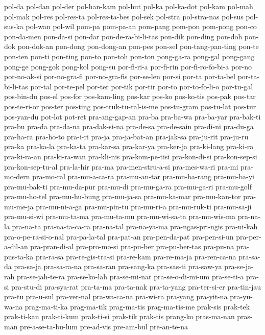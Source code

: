 {pol-da pol-dan pol-der pol-han-kam pol-hut pol-ka pol-ka-dot pol-kam
pol-mah pol-mak pol-res pol-res-ta pol-res-ta-bes pol-sek pol-stra
pol-stra-nas pol-sus pol-sus-ka pol-wan pol-wil pom-pa pom-pa-an pom-pang
pom-pon pom-pong pon-co pon-da-men pon-da-si pon-dar pon-de-ra-bi-li-tas
pon-dik pon-ding pon-doh pon-dok pon-dok-an pon-dong pon-dong-an pon-pes
pon-sel pon-tang-pan-ting pon-te pon-ten pon-ti pon-ting pon-to pon-toh
pon-ton pong-ga-ra pong-gal pong-gang pong-ge pong-gok pong-kol pong-su
por-fi-ri-a por-fi-rin por-fi-ro-fo-bi-a por-no por-no-ak-si por-no-gra-fi
por-no-gra-fis por-se-len por-si por-ta por-ta-bel por-ta-bi-li-tas
por-tal por-te-pel por-ter por-tik por-tir por-to por-to-fo-li-o
por-tu-gal pos-bin-du pos-el pos-for pos-kam-ling pos-kar pos-ko
pos-ko-tis pos-pak pos-tar pos-te-ri-or pos-ter pos-ting
pos-truk-tu-ral-is-me pos-tu-gram pos-tu-lat pos-tur pos-yan-du pot-lot
pot-ret pra-ang-gap-an pra-ba pra-ba-wa pra-ba-yar pra-bak-ti pra-bu
pra-da pra-da-na pra-dak-si-na pra-de-sa pra-de-sain pra-di-ni pra-du-ga
pra-ha-ra pra-ho-to pra-i-ri pra-ja pra-ja-bat-an pra-jak-sa pra-ju-rit
pra-ju-ru pra-ka pra-ka-la pra-ka-ta pra-kar-sa pra-kar-ya pra-ker-ja
pra-ki-lang pra-ki-ra pra-ki-ra-an pra-ki-ra-wan pra-kli-nis
pra-kom-pe-tisi pra-kon-di-si pra-kon-sep-si pra-kon-sep-tu-al pra-la-hir
pra-ma pra-men-stru-a-si pra-mes-wa-ri pra-mi pra-mo-dern pra-mo-ral
pra-mu-a-ca-ra pra-mu-an-tar pra-mu-ba-rang pra-mu-ba-yi pra-mu-bak-ti
pra-mu-da-pur pra-mu-di pra-mu-ga-ra pra-mu-ga-ri pra-mu-golf
pra-mu-ho-tel pra-mu-hu-bung pra-mu-ja-sa pra-mu-ka-mar pra-mu-kan-tor
pra-mu-me-ja pra-mu-ni-a-ga pra-mu-pin-tu pra-mu-ri-a pra-mu-ruk-ti
pra-mu-sa-ji pra-mu-si-wi pra-mu-ta-ma pra-mu-ta-mu pra-mu-wi-sa-ta
pra-mu-wis-ma pra-na-la pra-na-ta pra-na-ta-ca-ra pra-na-tal pra-na-ya-ma
pra-ngas-pri-ngis pra-ni-kah pra-o-pe-ra-si-o-nal pra-pa-la-tal pra-pat-an
pra-pen-da-pat pra-pen-si-un pra-per-a-dil-an pra-pran-di-al pra-pro-mo-si
pra-pu-ber pra-pu-ber-tas pra-pu-na pra-pus-ta-ka pra-ra-sa
pra-re-gis-tra-si pra-re-kam pra-re-ma-ja pra-ren-ca-na pra-sa-da
pra-sa-ja pra-sa-ra-na pra-sa-ran pra-sang-ka pra-sas-ti pra-saw-ya
pra-se-ja-rah pra-se-jah-te-ra pra-se-ko-lah pra-se-mi-nar
pra-se-o-di-mi-um pra-se-ti-a pra-si pra-stu-di pra-sya-rat pra-ta-ma
pra-ta-nak pra-ta-yang pra-ter-si-er pra-tin-jau pra-tu pra-u-sul
pra-ver-nal pra-wa-ca-na pra-wi-ra pra-yang pra-yit-na pra-yu-wa-na
prag-ma-ti-ka prag-ma-tik prag-ma-tis prag-ma-tis-me prak-sis prak-tek
prak-ti-kan prak-ti-kum prak-ti-si prak-tik prak-tis prang-ko pras-ma-nan
pras-man pre-a-se-ta-bu-lum pre-ad-vis pre-am-bul pre-an-te-na
}
